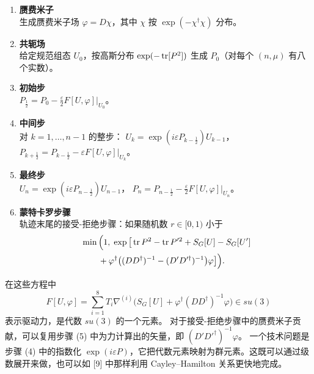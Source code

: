 \begin{enumerate}
  \item \textbf{赝费米子}\\
        生成赝费米子场 $\varphi = D\chi$，其中 $\chi$ 按 $\exp(-\chi^\dagger\chi)$ 分布。
  \item \textbf{共轭场}\\
        给定规范组态 $U_0$，按高斯分布 $\exp(-\operatorname{tr}[P^2])$ 生成 $P_0$（对每个 $(n,\mu)$ 有八个实数）。
  \item \textbf{初始步}\\
        $P_{\frac12} = P_0 - \frac{\varepsilon}{2}F[U,\varphi]\big|_{U_0}$。
  \item \textbf{中间步}\\
        对 $k = 1, \ldots, n-1$ 的整步：
        $U_k = \exp(i\varepsilon P_{k-\frac12})U_{k-1}$，\qquad
        $P_{k+\frac12} = P_{k-\frac12} - \varepsilon F[U,\varphi]\big|_{U_k}$。
  \item \textbf{最终步}\\
        $U_n = \exp(i\varepsilon P_{n-\frac12})U_{n-1}$，\qquad
        $P_n = P_{n-\frac12} - \frac{\varepsilon}{2}F[U,\varphi]\big|_{U_n}$。
  \item \textbf{蒙特卡罗步骤}\\
        轨迹末尾的接受-拒绝步骤：如果随机数 $r \in [0,1)$ 小于
        \begin{equation}
        \begin{aligned}
        &\min\Big(1,\;\exp\big[\operatorname{tr} P^2 - \operatorname{tr} P'^2 + S_G[U] - S_G[U']\\
        &\qquad + \varphi^\dagger\big((DD^\dagger)^{-1} - (D'D'^\dagger)^{-1}\big)\varphi\big]\Big).
        \end{aligned}
        \end{equation}
\end{enumerate}
在这些方程中
\begin{equation}
F[U,\varphi] = \sum_{i=1}^{8}T_i\nabla^{(i)}\Big(S_G[U] + \varphi^\dagger(DD^\dagger)^{-1}\varphi\Big) \in su(3)
\end{equation}
表示驱动力，是代数 $su(3)$ 的一个元素。
对于接受-拒绝步骤中的赝费米子贡献，可以复用步骤 (5) 中为力计算出的矢量，即 $(D'D'^\dagger)^{-1}\varphi$。
一个技术问题是步骤 (4) 中的指数化 $\exp(i\varepsilon P)$，它把代数元素映射为群元素。这既可以通过级数展开来做，也可以如 [9] 中那样利用 Cayley--Hamilton 关系更快地完成。

